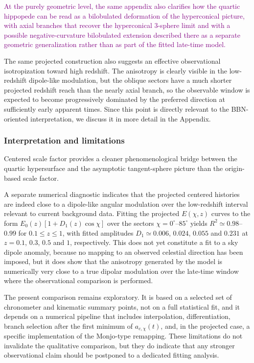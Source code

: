 \documentclass[11pt]{article}
\newcommand{\blue}[1]{{\color{blue}#1}}
\newcommand{\purple}[1]{\textcolor{purple}{#1}}
\begin{document}
\purple{At the purely geometric level, the same appendix also clarifies how the quartic hippopede can be read as a bilobulated deformation of the hyperconical picture, with axial branches that recover the hyperconical $3$-sphere limit and with a possible negative-curvature bilobulated extension described there as a separate geometric generalization rather than as part of the fitted late-time model.}

\blue{The same projected construction also suggests an effective observational isotropization toward high redshift. The anisotropy is clearly visible in the low-redshift dipole-like modulation, but the oblique sectors have a much shorter projected redshift reach than the nearly axial branch, so the observable window is expected to become progressively dominated by the preferred direction at sufficiently early apparent times. Since this point is directly relevant to the BBN-oriented interpretation, we discuss it in more detail in the Appendix.}

\subsubsection{\blue{Interpretation and limitations}}

Centered scale factor provides a cleaner phenomenological bridge between the quartic hypersurface and the asymptotic tangent-sphere picture than the origin-based scale factor.

\blue{A separate numerical diagnostic indicates that the projected centered histories are indeed close to a dipole-like angular modulation over the low-redshift interval relevant to current background data. Fitting the projected $E(\chi,z)$ curves to the form $E_0(z)[1+D_1(z)\cos\chi]$ over the sectors $\chi=0^\circ$--$85^\circ$ yields $R^2\simeq0.98$--$0.99$ for $0.1\le z\le1$, with fitted amplitudes $D_1\simeq0.006$, $0.024$, $0.055$ and $0.231$ at $z=0.1$, $0.3$, $0.5$ and $1$, respectively. This does not yet constitute a fit to a sky dipole anomaly, because no mapping to an observed celestial direction has been imposed, but it does show that the anisotropy generated by the model is numerically very close to a true dipolar modulation over the late-time window where the observational comparison is performed.}

The present comparison remains exploratory. It is based on a selected set of chronometer and kinematic summary points, not on a full statistical fit, and it depends on a numerical pipeline that includes interpolation, differentiation, branch selection after the first minimum of $a_{c,\chi}(t)$, and, in the projected case, a specific implementation of the Monjo-type remapping. These limitations do not invalidate the qualitative comparison, but they do indicate that any stronger observational claim should be postponed to a dedicated fitting analysis.
\end{document}
